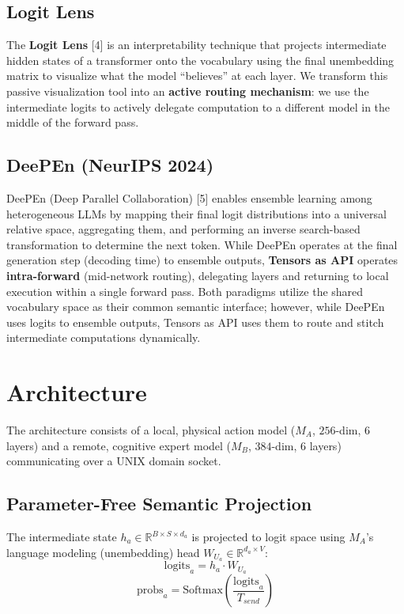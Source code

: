 \documentclass{article}
\begin{document}
\subsection{Logit Lens}
The \textbf{Logit Lens} [4] is an interpretability technique that projects intermediate hidden states of a transformer onto the vocabulary using the final unembedding matrix to visualize what the model ``believes'' at each layer. We transform this passive visualization tool into an \textbf{active routing mechanism}: we use the intermediate logits to actively delegate computation to a different model in the middle of the forward pass.

\subsection{DeePEn (NeurIPS 2024)}
DeePEn (Deep Parallel Collaboration) [5] enables ensemble learning among heterogeneous LLMs by mapping their final logit distributions into a universal relative space, aggregating them, and performing an inverse search-based transformation to determine the next token. While DeePEn operates at the final generation step (decoding time) to ensemble outputs, \textbf{Tensors as API} operates \textbf{intra-forward} (mid-network routing), delegating layers and returning to local execution within a single forward pass. Both paradigms utilize the shared vocabulary space as their common semantic interface; however, while DeePEn uses logits to ensemble outputs, Tensors as API uses them to route and stitch intermediate computations dynamically.

\section{Architecture}

The architecture consists of a local, physical action model ($M_A$, $256$-dim, $6$ layers) and a remote, cognitive expert model ($M_B$, $384$-dim, $6$ layers) communicating over a UNIX domain socket.

\subsection{Parameter-Free Semantic Projection}
The intermediate state $h_a \in \mathbb{R}^{B \times S \times d_a}$ is projected to logit space using $M_A$'s language modeling (unembedding) head $W_{U_a} \in \mathbb{R}^{d_a \times V}$:
\begin{equation}
\text{logits}_a = h_a \cdot W_{U_a}
\end{equation}
\begin{equation}
\text{probs}_a = \text{Softmax}\left(\frac{\text{logits}_a}{T_{send}}\right)
\end{equation}
\end{document}
